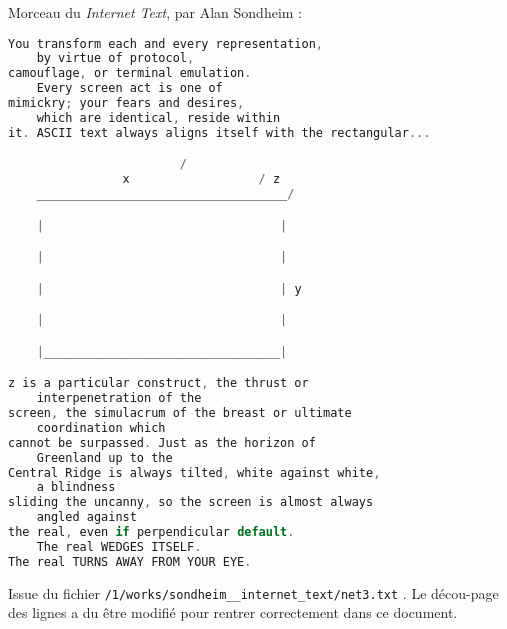 \documentclass[12pt]{article} %
\begin{document}
\newpage
Morceau du \textit{Internet Text}, par Alan Sondheim :
\begin{lstlisting}[language=C, caption={Internet Text, fragment de net3.txt}, label={codework:internet-text}]
You transform each and every representation, 
    by virtue of protocol,
camouflage, or terminal emulation. 
    Every screen act is one of
mimickry; your fears and desires, 
    which are identical, reside within
it. ASCII text always aligns itself with the rectangular...

                        /
                x                  / z
    ___________________________________/

    |                                 |

    |                                 |

    |                                 | y

    |                                 |

    |_________________________________|

z is a particular construct, the thrust or 
    interpenetration of the
screen, the simulacrum of the breast or ultimate
    coordination which
cannot be surpassed. Just as the horizon of 
    Greenland up to the
Central Ridge is always tilted, white against white, 
    a blindness
sliding the uncanny, so the screen is almost always 
    angled against
the real, even if perpendicular default. 
    The real WEDGES ITSELF.
The real TURNS AWAY FROM YOUR EYE.
\end{lstlisting}
Issue du fichier \verb|/1/works/sondheim__internet_text/net3.txt| \cite{ASondheim-net3}. Le décou-page des lignes a du être modifié pour rentrer correctement dans ce document.

\begin{lstlisting}[language=C, caption={}, label={codework:}]

\end{lstlisting}




\newpage
\printglossary[type=\acronymtype, title=Acronymes]

\printglossary[title=Glossaire]

\newpage
\printbibliography[
    heading=bibintoc,
    category=cited,
    title={Références}
]

\printbibliography[
    notcategory=cited,
    heading=bibintoc,
    title={Bibliographie complémentaire},
]


\restoregeometry
\end{document}
